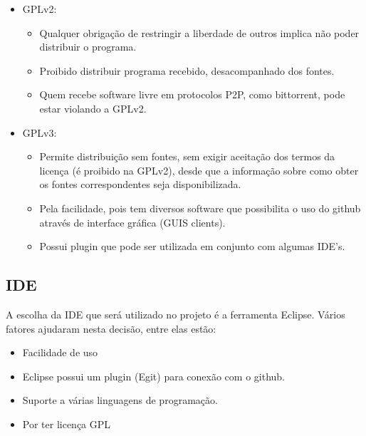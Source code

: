 \documentclass[12pt,a4paper]{article}
\begin{document}
\begin{itemize}
\item GPLv2:
\begin{itemize}
\item Qualquer obrigação de restringir a liberdade de outros implica não poder distribuir o programa.
\item Proibido distribuir programa recebido, desacompanhado dos fontes.
\item Quem recebe software livre em protocolos P2P, como bittorrent, pode estar violando a GPLv2.
\end{itemize}

\item GPLv3:
\begin{itemize}
\item Permite distribuição sem fontes, sem exigir aceitação dos termos da licença (é proibido na GPLv2), desde que a informação sobre como obter os fontes correspondentes seja disponibilizada.
\item Pela facilidade, pois tem diversos software que possibilita o uso do github através de interface gráfica (GUIS clients).
\item Possui plugin que pode ser utilizada em conjunto com algumas IDE's.
\end{itemize}
\end{itemize}

\subsection{IDE}

A escolha da IDE que será utilizado no projeto é a ferramenta Eclipse. Vários fatores ajudaram nesta decisão, entre elas estão:
\begin{itemize}
\item Facilidade de uso
\item Eclipse possui um plugin (Egit) para conexão com o github.
\item Suporte a várias linguagens de programação.
\item Por ter licença GPL
\end{itemize}



\begin{thebibliography}{9}



\end{thebibliography}
\end{document}
